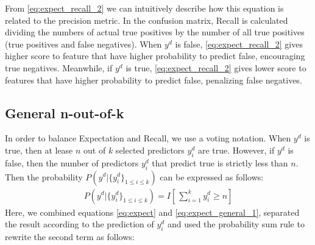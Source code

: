 \documentclass[11pt,a4paper]{article}
\begin{document}
From \eqref{eq:expect_recall_2} we can intuitively describe how this equation is related to the precision metric. In the confusion matrix, Recall is calculated dividing the numbers of actual true positives by the number of all true positives (true positives and false negatives). When $y^d$ is false, \eqref{eq:expect_recall_2} gives higher score to feature that have higher probability to predict false, encouraging true negatives. Meanwhile, if $y^d$ is true, \eqref{eq:expect_recall_2} gives lower score to features that have higher probability to predict false, penalizing false negatives.

\subsection{General n-out-of-k}
In order to balance Expectation and Recall, we use a voting notation. When $y^d$ is true, then at lease $n$ out of $k$ selected predictors $y_i^d$ are true. However, if $y^d$ is false, then the number of predictors $y_i^d$ that predict true is strictly less than $n.$ Then the probability $P\left(y^d|\{y^d_i\}_{1\leq i\leq k}\right)$ can be expressed as follows:
\begin{gather}
P\left(y^d|\{y_i^d\}_{1\leq i\leq k}\right)=I\left[\,\sum_{i=1}^ky_i^d\geq n\right]\label{eq:expect_general_1}
\end{gather}
Here, we combined equations \eqref{eq:expect} and \eqref{eq:expect_general_1}, separated the result according to the prediction of $y_i^d$ and used the probability sum rule to rewrite the second term as follows:
\end{document}
